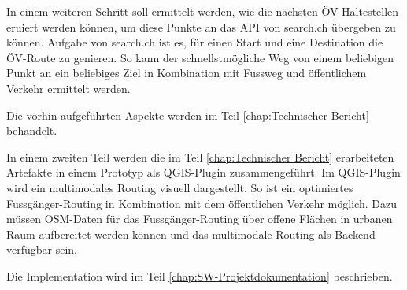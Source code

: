 In einem weiteren Schritt soll ermittelt werden, wie die nächsten ÖV-Haltestellen eruiert werden können, um diese Punkte an das \ac{API} von search.ch \cite{search_ch_route_api} übergeben zu können. Aufgabe von search.ch ist es, für einen Start und eine Destination die ÖV-Route zu genieren. So kann der schnellstmögliche Weg von einem beliebigen Punkt an ein beliebiges Ziel in Kombination mit Fussweg und öffentlichem Verkehr ermittelt werden.

Die vorhin aufgeführten Aspekte werden im Teil \ref{chap:Technischer Bericht} behandelt.

In einem zweiten Teil werden die im Teil \ref{chap:Technischer Bericht} erarbeiteten Artefakte in einem Prototyp als QGIS-Plugin zusammengeführt. Im QGIS-Plugin wird ein multimodales Routing visuell dargestellt. So ist ein optimiertes Fussgänger-Routing in Kombination mit dem öffentlichen Verkehr möglich. Dazu müssen \ac{OSM}-Daten für das Fussgänger-Routing über offene Flächen in urbanen Raum aufbereitet werden können und das multimodale Routing als Backend verfügbar sein.

Die Implementation wird im Teil \ref{chap:SW-Projektdokumentation} beschrieben.
